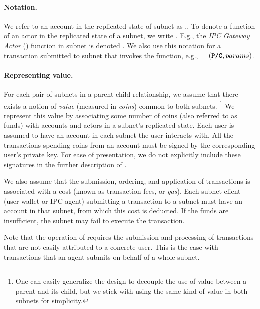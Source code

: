 \paragraph{Notation.} We refer to an account  in the replicated state of subnet  as ..
To denote a function of an actor in the replicated state of a subnet, we write .
E.g., the \emph{IPC Gateway Actor} (\gw) function  in subnet  is denoted .
We also use this notation for a transaction  submitted to subnet  that invokes the function, e.g.,  = $(\textbf{\texttt{P/C}}, params)$.

\paragraph{Representing value.}
For each pair of subnets in a parent-child relationship, we assume that there exists a notion of \emph{value} (measured in \emph{coins}) common to both subnets.%
\footnote{One can easily generalize the design to decouple the use of value between a parent and its child, but we stick with using the same kind of value in both subnets for simplicity.}
We represent this value by associating some number of coins (also referred to as funds) with accounts and actors in a subnet's replicated state.
Each user is assumed to have an account in each subnet the user interacts with.
All the transactions spending coins from an account must be signed by the corresponding user's private key.
For ease of presentation, we do not explicitly include these signatures in the further description of \ipc.

We also assume that the submission, ordering, and application of transactions is associated with a cost (known as transaction fees, or \emph{gas}).
Each subnet client (user wallet or IPC agent) submitting a transaction to a subnet must have an account in that subnet, from which this cost is deducted.
If the funds are insufficient, the subnet may fail to execute the transaction.

Note that the operation of \ipc requires the submission and processing of transactions that are not easily attributed to a concrete user.
This is the case with transactions that an \ipc agent submits on behalf of a whole subnet.


